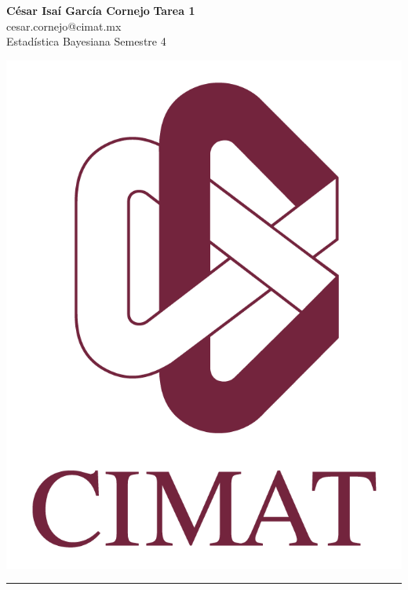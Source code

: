 \documentclass[a4paper, 11pt]{article}
\begin{document}
	\noindent
	
	\begin{minipage}[b][1.2cm][t]{0.8\textwidth}
		\large\textbf{César Isaí García Cornejo} \hfill \textbf{Tarea 1}  \\
		cesar.cornejo@cimat.mx \hfill \\
		\normalsize Estadística Bayesiana \hfill Semestre 4\\
	\end{minipage}
	
	\hspace{14.4cm}
	\begin{minipage}[b][0.03cm][t]{0.12\linewidth}
		
		\vspace{-2.2cm}
		\includegraphics[scale=0.3]{Figures/EscudoCimat.png}
	\end{minipage}
	
	\noindent\rule{7in}{2.8pt}
	
\end{document}
